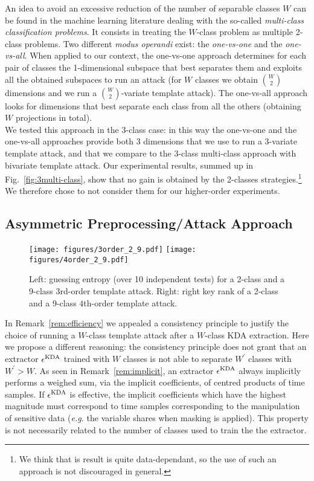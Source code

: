 An idea to avoid an excessive reduction of the number of separable classes $W$ can be found in the machine learning literature dealing with the so-called \emph{multi-class classification problems}. It consists in treating the $W$-class problem as  multiple 2-class problems. Two different \emph{modus operandi} exist: the \emph{one-vs-one} and the \emph{one-vs-all}. When applied to our context, the one-vs-one approach determines for each pair of classes the 1-dimensional subspace that best separates them and exploits all the obtained subspaces to run an attack (for $W$ classes we obtain ${W}\choose{2}$ dimensions and we run a ${W}\choose{2}$-variate template attack). The one-vs-all approach looks for dimensions that best separate each class from all the others (obtaining $W$ projections in total).\\


We tested this approach in the 3-class case: in this way the one-vs-one and the one-vs-all approaches provide both 3 dimensions that we use to run a $3$-variate template attack, and that we compare to the $3$-class multi-class approach with bivariate template attack. Our experimental results, summed up in Fig.~\ref{fig:3multi-class}, show that no gain  is obtained by the 2-classes strategies.\footnote{We think that is result is quite data-dependant, so the use of such an approach is not discouraged in general.} We therefore chose to not consider them for our higher-order experiments.



\subsection{Asymmetric Preprocessing/Attack Approach}\label{sec:asymmetric}

\begin{figure}
\texttt{[image: figures/3order\_2\_9.pdf]} 
\texttt{[image: figures/4order\_2\_9.pdf]} 
\caption{Left: guessing entropy (over 10 independent tests) for a 2-class and a 9-class $3$rd-order template attack. Right: right key rank of a 2-class and a 9-class $4$th-order template attack.}\label{fig:3-4}
\end{figure}
In Remark~\ref{rem:efficiency} we appealed a consistency principle to justify the choice of running a $W$-class template attack after a $W$-class KDA extraction. Here we propose a different reasoning: the consistency principle does not grant that an extractor $\epsilon^{\mathrm{KDA}}$ trained with $W$ classes is not able to separate $W^\prime$ classes with $W^\prime > W$. As seen in Remark~\ref{rem:implicit}, an extractor $\epsilon^{\mathrm{KDA}}$ always implicitly performs a weighed sum, via the implicit coefficients, of centred products of time samples. If $\epsilon^{\mathrm{KDA}}$ is effective, the implicit coefficients which have the highest magnitude must correspond to time samples corresponding to the manipulation of sensitive data (\emph{e.g.} the variable shares when masking is applied). This property is not necessarily related to the number of classes used to train the the extractor.\\

